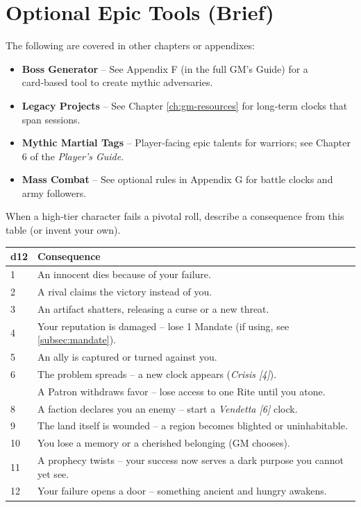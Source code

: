 \section{Optional Epic Tools (Brief)}

The following are covered in other chapters or appendixes:

\begin{itemize}
  \item \textbf{Boss Generator} – See Appendix F (in the full GM’s Guide) for a card‑based tool to create mythic adversaries.
  \item \textbf{Legacy Projects} – See Chapter \ref{ch:gm-resources} for long‑term clocks that span sessions.
  \item \textbf{Mythic Martial Tags} – Player‑facing epic talents for warriors; see Chapter 6 of the \textit{Player's Guide}.
  \item \textbf{Mass Combat} – See optional rules in Appendix G for battle clocks and army followers.
\end{itemize}

\begin{tcolorbox}[colback=red!5!white, colframe=red!75!black, title={The Mythic Failure Table (d12)}]

When a high‑tier character fails a pivotal roll, describe a consequence from this table (or invent your own).

\small
\begin{tabularx}{\textwidth}{lX}
\toprule
\textbf{d12} & \textbf{Consequence} \\
\midrule
1 & An innocent dies because of your failure. \\
2 & A rival claims the victory instead of you. \\
3 & An artifact shatters, releasing a curse or a new threat. \\
4 & Your reputation is damaged – lose 1 Mandate (if using, see \ref{subsec:mandate}). \\
5 & An ally is captured or turned against you. \\
6 & The problem spreads – a new clock appears (\emph{Crisis [4]}). \\
\addlinespace
7 & A Patron withdraws favor – lose access to one Rite until you atone. \\
8 & A faction declares you an enemy – start a \emph{Vendetta [6]} clock. \\
9 & The land itself is wounded – a region becomes blighted or uninhabitable. \\
10 & You lose a memory or a cherished belonging (GM chooses). \\
11 & A prophecy twists – your success now serves a dark purpose you cannot yet see. \\
12 & Your failure opens a door – something ancient and hungry awakens. \\
\bottomrule
\end{tabularx}
\normalsize
\end{tcolorbox}

